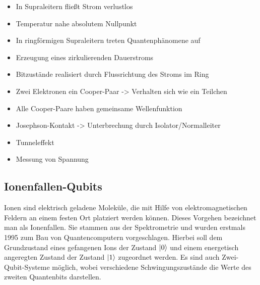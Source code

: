 \begin{itemize}
\item In Supraleitern fließt Strom verlustlos
\item Temperatur nahe absolutem Nullpunkt
\item In ringförmigen Supraleitern treten Quantenphänomene auf
\item Erzeugung eines zirkulierenden Dauerstroms
\item Bitzustände realisiert durch Flussrichtung des Stroms im Ring
\item Zwei Elektronen ein Cooper-Paar -> Verhalten sich wie ein Teilchen
\item Alle Cooper-Paare haben gemeinsame Wellenfunktion
\item Josephson-Kontakt -> Unterbrechung durch Isolator/Normalleiter
\item Tunneleffekt
\item Messung von Spannung
\end{itemize}

\subsection{Ionenfallen-Qubits }

Ionen sind elektrisch geladene Moleküle, die mit Hilfe von elektromagnetischen Feldern an einem festen Ort platziert werden können. Dieses Vorgehen bezeichnet man als Ionenfallen. Sie stammen aus der Spektrometrie und wurden erstmals 1995 zum Bau von Quantencomputern vorgeschlagen. Hierbei soll dem Grundzustand eines gefangenen Ions der Zustand $\ket0$ und einem energetisch angeregten Zustand der Zustand $\ket1$ zugeordnet werden. Es sind auch Zwei-Qubit-Systeme möglich, wobei verschiedene Schwingungszustände die Werte des zweiten Quantenbits darstellen. 
\cite{homeister_quantum_2022}
\\

